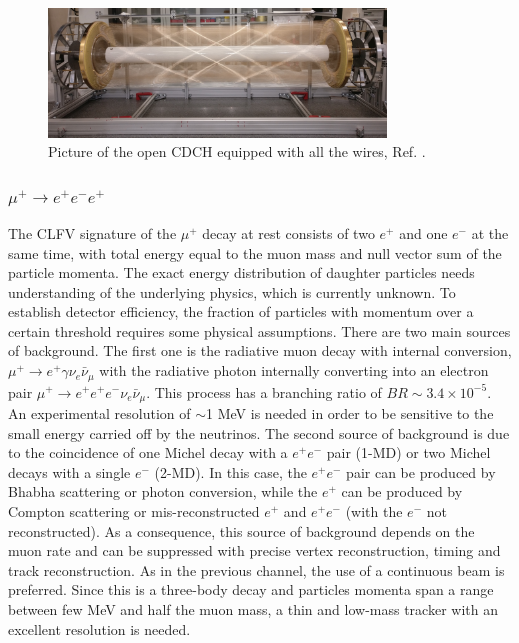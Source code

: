 \begin{figure}[!h]
\centering
\includegraphics[width =0.8\textwidth]{figures/png/Screenshot_20240307_140235.png}
\caption{Picture of the open CDCH equipped with all the wires, Ref. \cite{megiicollaboration2024operation}.}
\label{fig:meg2}
\end{figure}






\subsubsection{$\mu^+ \rightarrow e^+ e^-  e^+ $}
The CLFV signature of the $\mu^+$ decay at rest consists of two $e^+$ and one $e^-$ at the same time, 
with total energy equal to the muon mass and null vector sum of the
particle momenta.  The exact energy distribution of daughter particles needs understanding of the underlying physics, 
which is currently unknown. To establish detector efficiency, the fraction of particles with momentum over a certain 
threshold requires some physical assumptions.
There are two main sources of background. The first one is the radiative muon decay with 
internal conversion, $\mu^+ \rightarrow e^+ \gamma \nu_e \bar{\nu}_\mu$ with the radiative
photon internally converting into an electron pair $\mu^+ \rightarrow e^+ e^+ e^- \nu_e \bar{\nu}_\mu$. 
This process has a branching ratio of $BR\sim 3.4 \times 10^{-5}$.
An experimental resolution of $\sim$1 MeV is needed in order to be sensitive to the small energy carried off by the neutrinos. 
The second source of background is due to the coincidence of one Michel decay with a $e^+e^-$ pair (1-MD) or two Michel decays with a single $e^-$ (2-MD). 
In this case, the $e^+e^-$ pair can be produced by Bhabha scattering or photon conversion, while the $e^+$
can be produced by Compton scattering or mis-reconstructed $e^+$ and $e^+e^-$ (with the $e^-$ not reconstructed). 
As a consequence, this source of background depends on the muon rate and
can be suppressed with precise vertex reconstruction, timing and track reconstruction.
As in the previous channel, the use of a continuous beam is preferred.
Since this is a three-body decay and particles momenta span a range between few MeV 
and half the muon mass, a thin and low-mass tracker with an excellent resolution is needed. 
